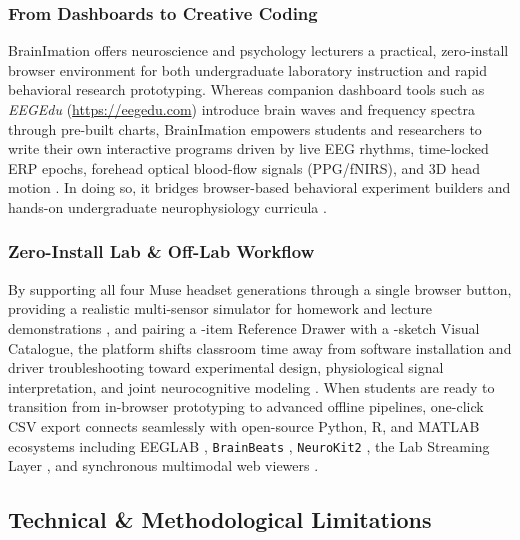 \documentclass[11pt]{article}
\begin{document}
\subsubsection{From Dashboards to Creative Coding}
BrainImation offers neuroscience and psychology lecturers a practical, zero-install browser environment for both undergraduate laboratory instruction and rapid behavioral research prototyping. Whereas companion dashboard tools such as \emph{EEGEdu} (\url{https://eegedu.com}) \citep{mathewson2026eegedu} introduce brain waves and frequency spectra through pre-built charts, BrainImation empowers students and researchers to write their own interactive programs driven by live EEG rhythms, time-locked ERP epochs, forehead optical blood-flow signals (PPG/fNIRS), and 3D head motion \citep{papert1980mindstorms,resnick2009scratch,deleeuw2015jspsych,henninger2022labjs}. In doing so, it bridges browser-based behavioral experiment builders \citep{woods2015conducting,dalmaijer2022mouseview,pronk2023jsquestplus,deleeuw2024datapipe} and hands-on undergraduate neurophysiology curricula \citep{janssen2021opportunities,hatton2023quantitative,smith2024lowcost,iemi2026icancode}.

\subsubsection{Zero-Install Lab \& Off-Lab Workflow}
By supporting all four Muse headset generations through a single browser button, providing a realistic multi-sensor simulator for homework and lecture demonstrations \citep{deleeuw2023simulating}, and pairing a \NRefAPIs-item Reference Drawer with a \NCatalogueSketches-sketch Visual Catalogue, the platform shifts classroom time away from software installation and driver troubleshooting toward experimental design, physiological signal interpretation, and joint neurocognitive modeling \citep{frischkorn2018cognitive,schubert2023enhancing,nunez2024tutorial,dekleijn2025phasic}. When students are ready to transition from in-browser prototyping to advanced offline pipelines, one-click CSV export connects seamlessly with open-source Python, R, and MATLAB ecosystems including EEGLAB \citep{delorme2004eeglab}, \texttt{BrainBeats} \citep{cannard2024brainbeats}, \texttt{NeuroKit2} \citep{makowski2021neurokit2}, the Lab Streaming Layer \citep{kothe2025lsl}, and synchronous multimodal web viewers \citep{pijalek2026meedav}.

\subsection{Technical \& Methodological Limitations}
\end{document}
